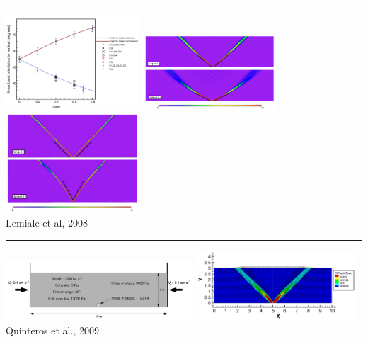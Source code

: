 \begin{center}\noindent\rule{8cm}{0.4pt}\end{center}

\begin{center}
\includegraphics[width=5cm]{images/benchmark_brick/lemm08a}
\includegraphics[width=5cm]{images/benchmark_brick/lemm08b}
\includegraphics[width=5cm]{images/benchmark_brick/lemm08c}\\
{\captionfont Lemiale et al, 2008 \cite{lemm08}}
\end{center}

\begin{center}\noindent\rule{8cm}{0.4pt}\end{center}

\begin{center}
\includegraphics[width=7cm]{images/benchmark_brick/qurj09b}
\includegraphics[width=6cm]{images/benchmark_brick/qurj09a}\\
{\captionfont Quinteros et al., 2009 \cite{qurj09}}
\end{center}

